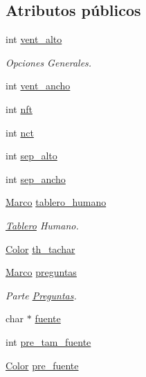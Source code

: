 \subsection*{Atributos públicos}
\begin{CompactItemize}
\item 
int \hyperlink{class_config_375dbaaec6f89886b6195655b7f798fa}{vent\_\-alto}
\begin{CompactList}\small\item\em Opciones Generales. \item\end{CompactList}\item 
int \hyperlink{class_config_b3dd58673f2af65f7ae5d801daf8c448}{vent\_\-ancho}
\item 
int \hyperlink{class_config_2200cb13ef26eee671b9a1c1de4bfb2f}{nft}
\item 
int \hyperlink{class_config_e234bd53f1f5cf692f15509f82ca1233}{nct}
\item 
int \hyperlink{class_config_b1160d5fb2c2f5bb524f98b83bf47dc7}{sep\_\-alto}
\item 
int \hyperlink{class_config_f79dabb44eb858869d54dad5a35e50b2}{sep\_\-ancho}
\item 
\hyperlink{class_marco}{Marco} \hyperlink{class_config_6330c7b3a76652ae994fb700f9c5b0cd}{tablero\_\-humano}
\begin{CompactList}\small\item\em \hyperlink{class_tablero}{Tablero} Humano. \item\end{CompactList}\item 
\hyperlink{struct_color}{Color} \hyperlink{class_config_a1351994125131a976c61e8d8554c6d6}{th\_\-tachar}
\item 
\hyperlink{class_marco}{Marco} \hyperlink{class_config_27f29ca03d9307e6622fba1bba7159c8}{preguntas}
\begin{CompactList}\small\item\em Parte \hyperlink{class_preguntas}{Preguntas}. \item\end{CompactList}\item 
char $\ast$ \hyperlink{class_config_7346dfc8027f9d63ca5452fbb05dbfb5}{fuente}
\item 
int \hyperlink{class_config_e2a6648535112d37a98ee87e05073fc2}{pre\_\-tam\_\-fuente}
\item 
\hyperlink{struct_color}{Color} \hyperlink{class_config_0a6e9c45700357211744f32b60ac21f9}{pre\_\-fuente}
\item 

\end{CompactItemize}
